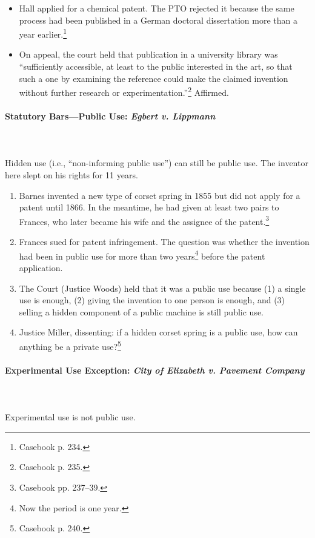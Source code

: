 \begin{itemize}
    \item Hall applied for a chemical patent. The PTO rejected it because the 
    same process had been published in a German doctoral dissertation more than 
    a year earlier.\footnote{Casebook p. 234.}
    \item On appeal, the court held that publication in a university library was 
    ``sufficiently accessible, at least to the public interested in the art, so 
    that such a one by examining the reference could make the claimed invention 
    without further research or experimentation.''\footnote{Casebook p. 235.} 
    Affirmed.
\end{itemize}

\paragraph{Statutory Bars---Public Use: \emph{Egbert v. Lippmann}}
~\\\\
Hidden use (i.e., ``non-informing public use'') can still be public use. The 
inventor here slept on his rights for 11 years.

\begin{enumerate}
    \item Barnes invented a new type of corset spring in 1855 but did not apply 
    for a patent until 1866. In the meantime, he had given at least two pairs to 
    Frances, who later became his wife and the assignee of the 
    patent.\footnote{Casebook pp. 237--39.}
    \item Frances sued for patent infringement. The question was whether the 
    invention had been in public use for more than two years\footnote{Now the 
    period is one year.} before the patent application.
    \item The Court (Justice Woods) held that it was a public use because (1) a 
    single use is enough, (2) giving the invention to one person is enough, and 
    (3) selling a hidden component of a public machine is still public use.
    \item Justice Miller, dissenting: if a hidden corset spring is a public use, 
    how can anything be a private use?\footnote{Casebook p. 240.}
\end{enumerate}

\paragraph{Experimental Use Exception: \emph{City of Elizabeth v. Pavement 
Company}}
~\\\\
Experimental use is not public use.

